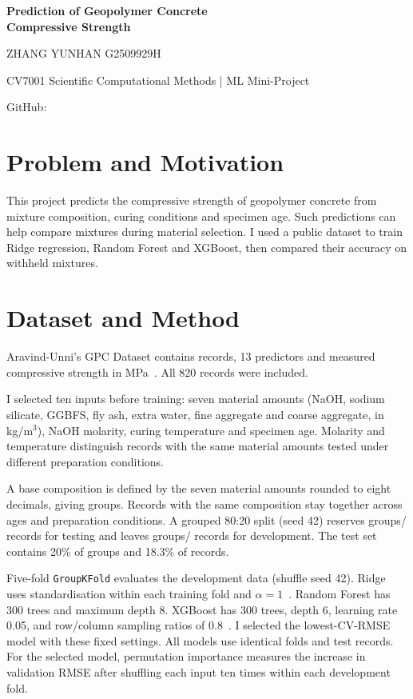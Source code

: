 \documentclass[10pt,a4paper]{article}
\begin{document}
\begin{center}
{\Large\bfseries Prediction of Geopolymer Concrete\\Compressive Strength\par}
\vspace{5pt}
{\normalsize ZHANG YUNHAN \quad G2509929H\par}
\vspace{2pt}
{\small CV7001 Scientific Computational Methods \quad | \quad ML Mini-Project\par}
{\small GitHub: \RepositoryLink\par}
\end{center}
\vspace{-6pt}

\section{Problem and Motivation}
This project predicts the compressive strength of geopolymer concrete from mixture composition, curing conditions and specimen age. Such predictions can help compare mixtures during material selection. I used a public dataset to train Ridge regression, Random Forest and XGBoost, then compared their accuracy on withheld mixtures.

\section{Dataset and Method}
Aravind-Unni's GPC Dataset contains \Ntotal{} records, 13 predictors and measured compressive strength in MPa~\cite{data}. All 820 records were included.

I selected ten inputs before training: seven material amounts (NaOH, sodium silicate, GGBFS, fly ash, extra water, fine aggregate and coarse aggregate, in kg/m$^3$), NaOH molarity, curing temperature and specimen age. Molarity and temperature distinguish records with the same material amounts tested under different preparation conditions.

A base composition is defined by the seven material amounts rounded to eight decimals, giving \Ngroups{} groups. Records with the same composition stay together across ages and preparation conditions. A grouped 80:20 split (seed 42) reserves \NtestGroups{} groups/\Ntest{} records for testing and leaves \NtrainGroups{} groups/\Ntrain{} records for development. The test set contains 20\% of groups and 18.3\% of records.

Five-fold \texttt{GroupKFold} evaluates the development data (shuffle seed 42). Ridge uses standardisation within each training fold and $\alpha=1$~\cite{sklearn}. Random Forest has 300 trees and maximum depth 8. XGBoost has 300 trees, depth 6, learning rate 0.05, and row/column sampling ratios of 0.8~\cite{xgb}. I selected the lowest-CV-RMSE model with these fixed settings. All models use identical folds and test records. For the selected model, permutation importance measures the increase in validation RMSE after shuffling each input ten times within each development fold.
\end{document}
